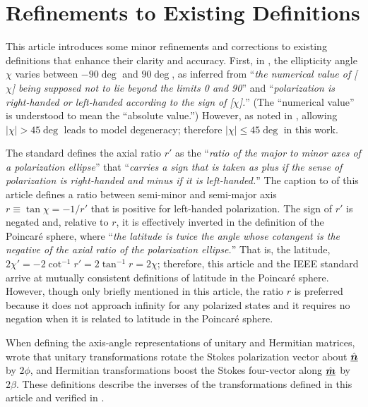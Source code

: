 \section{Refinements to Existing Definitions}
\label{app:refinements}


This article introduces some minor refinements and corrections to existing definitions that enhance their clarity and accuracy.
%
First, in \cite{sto52}, the ellipticity angle $\chi$ varies between $-90\deg$ and $90\deg$, as inferred from ``\emph{the numerical value of [$\chi$] being supposed not to lie beyond the limits 0 and 90\deg}'' and ``\emph{polarization is right-handed or left-handed according to the sign of [$\chi$].}''  (The ``numerical value'' is understood to mean the ``absolute value.'')  However, as noted in , allowing $|\chi| > 45\deg$ leads to model degeneracy; therefore $|\chi| \le 45\deg$ in this work.

The \cite{ieee145} standard defines the axial ratio $r'$ as the ``\emph{ratio
of the major to minor axes of a polarization ellipse}'' that ``\emph{carries a sign that is
taken as plus if the sense of polarization is right-handed and minus if it is left-handed.}''
%
The caption to  of this article defines a ratio between semi-minor and semi-major axis $r \equiv \tan\chi = -1/r'$ that is positive for left-handed polarization.
%
The sign of $r'$ is negated and, relative to $r$, it is effectively inverted in the \cite{ieee145} definition of the Poincar\'{e} sphere, where ``\emph{the latitude is twice the angle whose cotangent is the negative of the axial ratio of the polarization ellipse.}''  That is, the latitude, $2\chi' = -2\cot^{-1} r' = 2\tan^{-1} r = 2\chi$; therefore, this article and the IEEE standard arrive at mutually consistent definitions of latitude in the Poincar\'{e} sphere.
%
However, though only briefly mentioned in this article, the ratio $r$ is preferred because it does not approach infinity for any polarized states and it requires no negation when it is related to latitude in the Poincar\'{e} sphere.

When defining the axis-angle representations of unitary and Hermitian matrices, \cite{bri00} wrote that unitary transformations rotate the Stokes polarization vector about $\hat{\underline{\mbox{\boldmath $n$}}}$ by $2\phi$, and Hermitian transformations boost the Stokes four-vector along $\hat{\underline{\mbox{\boldmath $m$}}}$ by $2\beta$.  These definitions describe the inverses of the transformations defined in this article and verified in .
